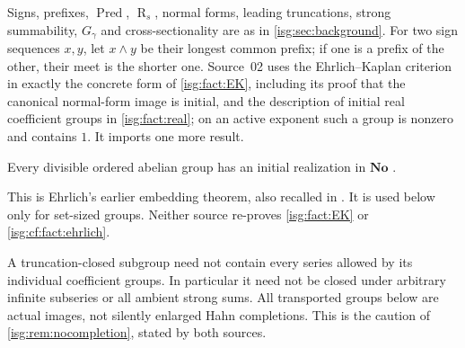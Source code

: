 \documentclass[11pt]{article}
\theoremstyle{definition}
\theoremstyle{remark}
\newcommand{\No}{\ensuremath{\mathbf{No}}}
\newcommand{\Pred}{\operatorname{Pred}}
\newcommand{\Rs}{\operatorname{R}_{s}}
\begin{document}
Signs, prefixes, $\Pred$, $\Rs$, normal forms, leading truncations,
strong summability, $G_\gamma$ and cross-sectionality are as in
\cref{isg:sec:background}. For two sign sequences $x,y$, let $x\wedge y$
be their longest common prefix; if one is a prefix of the other, their
meet is the shorter one. Source~02 uses the Ehrlich--Kaplan criterion in
exactly the concrete form of \cref{isg:fact:EK}, including its proof that
the canonical normal-form image is initial, and the description of initial
real coefficient groups in \cref{isg:fact:real}; on an active exponent such
a group is nonzero and contains $1$. It imports one more result.

\begin{fact}\label{isg:cf:fact:ehrlich}
Every divisible ordered abelian group has an initial realization in
$\No$ \cite{Ehrlich}.
\end{fact}
This is Ehrlich's earlier embedding theorem, also recalled in \cite{EK}.
It is used below only for set-sized groups. Neither source re-proves
\cref{isg:fact:EK} or \cref{isg:cf:fact:ehrlich}.

\begin{remark}\label{isg:cf:rem:membership}
A truncation-closed subgroup need not contain every series allowed by its
individual coefficient groups. In particular it need not be closed under
arbitrary infinite subseries or all ambient strong sums. All transported
groups below are actual images, not silently enlarged Hahn completions.
This is the caution of \cref{isg:rem:nocompletion}, stated by both
sources.
\end{remark}
\end{document}
